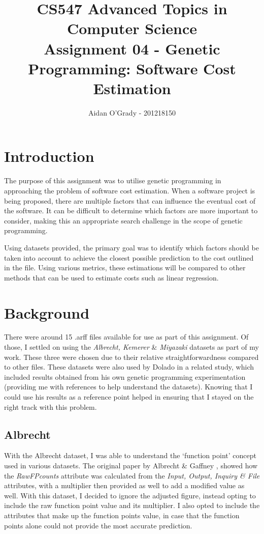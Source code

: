 \documentclass[10pt, a4paper]{article}
\begin{document}
\title{CS547 Advanced Topics in Computer Science\\
\large{Assignment 04 - Genetic Programming: Software Cost Estimation}}
\author{Aidan O'Grady - 201218150}
\date{}
\maketitle
\section{Introduction} %
\label{sec:introduction}
The purpose of this assignment was to utilise genetic programming in approaching
the problem of software cost estimation. When a software project is being
proposed, there are multiple factors that can influence the eventual cost of the
software. It can be difficult to determine which factors are more important to
consider, making this an appropriate search challenge in the scope of genetic
programming.

Using datasets provided, the primary goal was to identify which factors should
be taken into account to achieve the closest possible prediction to the cost
outlined in the file. Using various metrics, these estimations will be compared
to other methods that can be used to estimate costs such as linear regression.

\section{Background} %
\label{sec:background}
There were around 15 .arff files available for use as part of this assignment.
Of those, I settled on using the \emph{Albrecht, Kemerer} \& \emph{Miyazaki}
datasets as part of my work. These three were chosen due to their relative
straightforwardness compared to other files. These datasets were also used by
Dolado \cite{Dolado200161} in a related study, which included results obtained
from his own genetic programming experimentation (providing me with references
to help understand the datasets). Knowing that I could use his results as a
reference point helped in ensuring that I stayed on the right track with this
problem.

\subsection{Albrecht} %
\label{sub:albrecht}
With the Albrecht dataset, I was able to understand the `function point' concept
used in various datasets. The original paper by Albrecht \& Gaffney
\cite{1703110}, showed how the \emph{RawFPcounts} attribute was calculated
from the \emph{Input, Output, Inquiry \& File} attributes, with a multiplier
then provided as well to add a modified value as well. With this dataset, I
decided to ignore the adjusted figure, instead opting to include the raw
function point value and its multiplier. I also opted to include the attributes
that make up the function points value, in case that the function points alone
could not provide the most accurate prediction.
\end{document}
